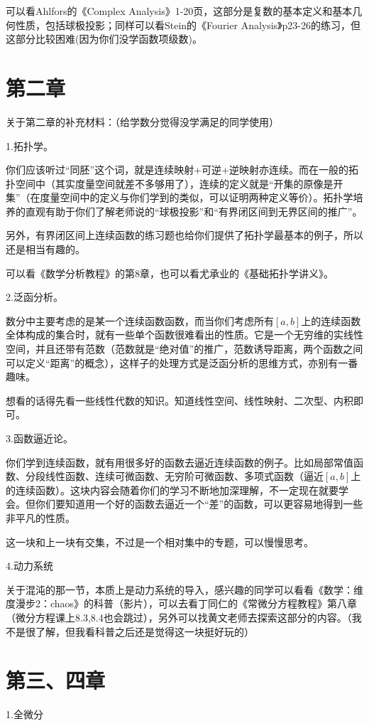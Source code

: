 \documentclass{ctexart}
\begin{document}
可以看Ahlfors的《Complex Analysis》1-20页，这部分是复数的基本定义和基本几何性质，包括球极投影；同样可以看Stein的《Fourier Analysis》p23-26的练习，但这部分比较困难(因为你们没学函数项级数)。

\section{第二章}

关于第二章的补充材料：（给学数分觉得没学满足的同学使用）

1.拓扑学。

你们应该听过“同胚”这个词，就是连续映射+可逆+逆映射亦连续。而在一般的拓扑空间中（其实度量空间就差不多够用了），连续的定义就是“开集的原像是开集”（在度量空间中的定义与你们学到的类似，可以证明两种定义等价）。拓扑学培养的直观有助于你们了解老师说的“球极投影”和“有界闭区间到无界区间的推广”。

另外，有界闭区间上连续函数的练习题也给你们提供了拓扑学最基本的例子，所以还是相当有趣的。

可以看《数学分析教程》的第8章，也可以看尤承业的《基础拓扑学讲义》。

2.泛函分析。

数分中主要考虑的是某一个连续函数函数，而当你们考虑所有$[a,b]$上的连续函数全体构成的集合时，就有一些单个函数很难看出的性质。它是一个无穷维的实线性空间，并且还带有范数（范数就是“绝对值”的推广，范数诱导距离，两个函数之间可以定义“距离”的概念），这样子的处理方式是泛函分析的思维方式，亦别有一番趣味。

想看的话得先看一些线性代数的知识。知道线性空间、线性映射、二次型、内积即可。

3.函数逼近论。

你们学到连续函数，就有用很多好的函数去逼近连续函数的例子。比如局部常值函数、分段线性函数、连续可微函数、无穷阶可微函数、多项式函数（逼近$[a,b]$上的连续函数）。这块内容会随着你们的学习不断地加深理解，不一定现在就要学会。但你们要知道用一个好的函数去逼近一个“差”的函数，可以更容易地得到一些非平凡的性质。

这一块和上一块有交集，不过是一个相对集中的专题，可以慢慢思考。

4.动力系统

关于混沌的那一节，本质上是动力系统的导入，感兴趣的同学可以看看《数学：维度漫步2：chaos》的科普（影片），可以去看丁同仁的《常微分方程教程》第八章（微分方程课上8.3,8.4也会跳过），另外可以找黄文老师去探索这部分的内容。（我不是很了解，但我看科普之后还是觉得这一块挺好玩的）

\section{第三、四章}
1.全微分
\end{document}
